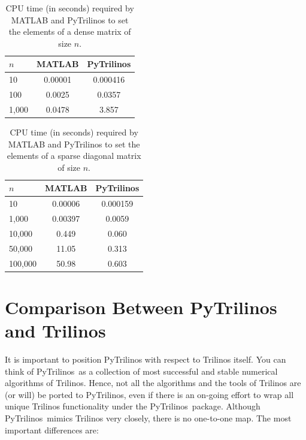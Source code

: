 \documentclass[10pt,relax]{SANDreport}
\newcommand{\PyTrilinos}{{PyTrilinos}}
\begin{document}
\begin{table}
\begin{center}
\begin{tabular}{| l | c | c |}
\hline
$n$ & MATLAB & PyTrilinos \\
\hline
\hline
10     & 0.00001 & 0.000416 \\
100    & 0.0025 & 0.0357 \\
1,000  & 0.0478 & 3.857 \\
\hline
\end{tabular}
\caption{CPU time (in seconds) required by MATLAB and PyTrilinos to set the
  elements of a  dense matrix of size $n$.}
\label{tab:matlab_dense}
\end{center}
\end{table}

\begin{table}
\begin{center}
\begin{tabular}{| l | c | c |}
\hline
$n$ & MATLAB & PyTrilinos \\
\hline
\hline
10      & 0.00006 & 0.000159 \\
1,000   & 0.00397 & 0.0059 \\
10,000  & 0.449   & 0.060 \\
50,000  & 11.05   & 0.313 \\
100,000 & 50.98   & 0.603 \\
\hline
\end{tabular}
\caption{CPU time (in seconds) required by MATLAB and PyTrilinos to set the
  elements of a  sparse diagonal matrix of size $n$.}
\label{tab:matlab_sparse}
\end{center}
\end{table}

\section{Comparison Between PyTrilinos and Trilinos}
\label{sec:comparison_trilinos}

It is  important to position PyTrilinos with respect to Trilinos
itself. You can think of \PyTrilinos\ as a collection of most
successful and stable numerical algorithms of Trilinos.  Hence, not
all the algorithms and the tools of Trilinos are (or will) be ported
to \PyTrilinos, even if there is an on-going effort to wrap all
unique Trilinos functionality under the \PyTrilinos\ package.
Although \PyTrilinos\ mimics Trilinos very closely, there is no
one-to-one map. The most important differences are:
\end{document}
